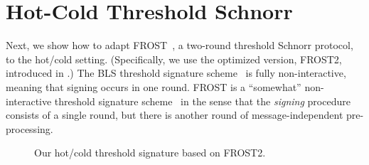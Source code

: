 \section{Hot-Cold Threshold Schnorr}\label{sec:frost_construction}

Next, we show how to adapt FROST~\cite{SAC:KomGol20,EPRINT:CriKomMal21,C:BCKMTZ22}, a two-round threshold Schnorr protocol, to the hot/cold setting. (Specifically, we use the optimized version, FROST2, introduced in \cite{EPRINT:CriKomMal21}.) 
The BLS threshold signature scheme~\cite{AC:BonLynSha01} is fully non-interactive, meaning that signing occurs in one round.
FROST is a ``somewhat'' non-interactive threshold signature scheme~\cite{EPRINT:BelTesZhu22} in the sense that the \emph{signing} procedure consists of a single round, but there is another round of message-independent pre-processing.
 

\begin{figure}[htb]
    \centering
    \caption{Our hot/cold threshold signature based on FROST2.}
    \label{fig:hc-frost}
\end{figure}

